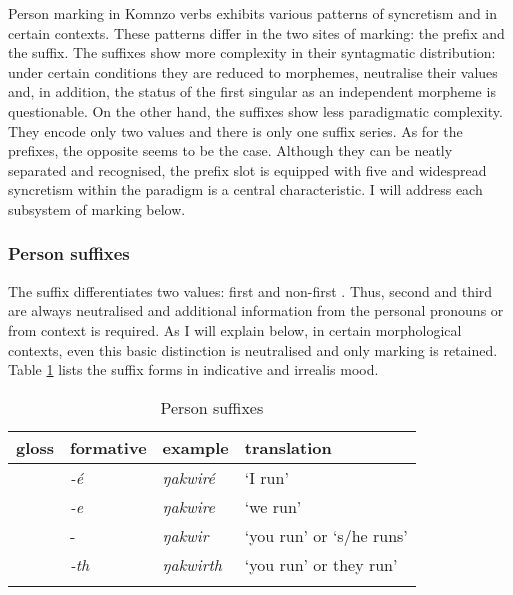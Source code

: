 Person marking in Komnzo verbs exhibits various patterns of syncretism and  in certain contexts. These patterns differ in the two sites of  marking: the prefix and the suffix. The suffixes show more complexity in their syntagmatic distribution: under certain conditions they are reduced to  morphemes, neutralise their  values and, in addition, the status of the first singular as an independent morpheme is questionable. On the other hand, the suffixes show less paradigmatic complexity. They encode only two  values and there is only one suffix series. As for the prefixes, the opposite seems to be the case. Although they can be neatly separated and recognised, the prefix slot is equipped with five  and widespread syncretism within the paradigm is a central characteristic. I will address each subsystem of  marking below.

\subsubsection{Person suffixes} \label{personsuffsection}

The  suffix differentiates two  values: first and non-first . Thus, second and third  are always neutralised and additional information from the personal pronouns or from context is required. As I will explain below, in certain morphological contexts, even this basic distinction is neutralised and only  marking is retained. Table \ref{perssuff} lists the suffix forms in indicative and irrealis mood.

\begin{table}
\caption{Person suffixes}
\label{perssuff}
	\begin{tabular}{llll}
		\lsptoprule
		{gloss} & {formative} & {example} &{translation}\\\midrule
		\Fsg &\emph{-é} &\emph{ŋakwiré}	&`I run'\\
		\Fnsg &\emph{-e} &\emph{ŋakwire} &`we run'\\
		\Stsg &-\Zero &\emph{ŋakwir} &`you run' or `s/he runs'\\
		\Stnsg &\emph{-th} &\emph{ŋakwirth}	&`you run' or they run'\\
		\lspbottomrule
	\end{tabular}
\end{table}%

